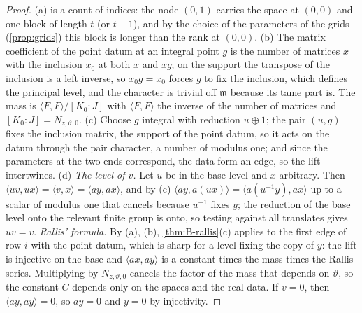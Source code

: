\begin{proof}
(a) is a count of indices: the node $(0,1)$ carries the space at $(0,0)$ and one block of length $t$ (or $t-1$), and by the choice of the parameters of the grids (\cref{prop:grids}) this block is longer
than the rank at $(0,0)$. (b) The matrix
coefficient of the point datum at an integral point $g$ is the number of matrices $x$ with the inclusion $x_0$ at both $x$ and $xg$; on the support the transpose of the inclusion is a left inverse, so $x_0g=x_0$
forces $g$ to fix the inclusion, which defines the principal level, and the character is trivial off $\mathfrak m$ because its tame part is. The mass is $\langle F,F\rangle/[K_0:J]$ with $\langle F,F\rangle$ the
inverse of the number of matrices and $[K_0:J]=N_{z,\vartheta,0}$. (c) Choose $g$ integral with reduction $u\oplus1$; the pair $(u,g)$ fixes the inclusion matrix, the support of the point datum, so it acts on the
datum through the pair character, a number of modulus one; and since the parameters at the two ends correspond, the data form an edge, so the lift intertwines. (d) \emph{The level of $v$.} Let $u$ be in the base
level and $x$ arbitrary. Then $\langle uv,ux\rangle=\langle v,x\rangle=\langle ay,ax\rangle$, and by (c) $\langle ay,a(ux)\rangle=\langle a(u^{-1}y),ax\rangle$ up to a scalar of modulus one that cancels because $u^{-1}$ fixes $y$; the reduction
of the base level onto the relevant finite group is onto, so testing against all translates gives $uv=v$. \emph{Rallis' formula.} By (a), (b), \cref{thm:B-rallis}(c) applies to the first edge of row $i$ with the point
datum, which is sharp for a level fixing the copy of $y$: the lift is injective on the base and $\langle ax,ay\rangle$ is a constant times the mass times the Rallis series. Multiplying by $N_{z,\vartheta,0}$ cancels the
factor of the mass that depends on $\vartheta$, so the constant $C$ depends only on the spaces and the real data. If $v=0$, then $\langle ay,ay\rangle=0$, so $ay=0$ and $y=0$ by injectivity.
\end{proof}

